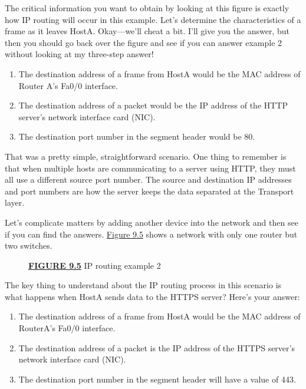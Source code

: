 The critical information you want to obtain by looking at this figure is
exactly how IP routing will occur in this example. Let's determine the
characteristics of a frame as it leaves HostA. Okay---we'll cheat a bit.
I'll give you the answer, but then you should go back over the figure
and see if you can answer example 2 without looking at my three-step
answer!

\begin{enumerate}
\tightlist
\item
  The destination address of a frame from HostA would be the MAC address
  of Router A's Fa0/0 interface.
\item
  The destination address of a packet would be the IP address of the
  HTTP server's network interface card (NIC).
\item
  The destination port number in the segment header would be 80.
\end{enumerate}

That was a pretty simple, straightforward scenario. One thing to
remember is that when multiple hosts are communicating to a server using
HTTP, they must all use a different source port number. The source and
destination IP addresses and port numbers are how the server keeps the
data separated at the Transport layer.

Let's complicate matters by adding another device into the network and
then see if you can find the answers.
\protect\hyperlink{c09.xhtmlux5cux23figure9-5}{Figure 9.5} shows a
network with only one router but two switches.

\begin{figure}
\centering
\caption{{\protect\hyperlink{c09.xhtmlux5cux23figureanchor9-5}{\textbf{FIGURE
9.5}} IP routing example 2}}
\end{figure}

\protect\hypertarget{c09.xhtmlux5cux23Page_369}{}{}The key thing to
understand about the IP routing process in this scenario is what happens
when HostA sends data to the HTTPS server? Here's your answer:

\begin{enumerate}
\tightlist
\item
  The destination address of a frame from HostA would be the MAC address
  of RouterA's Fa0/0 interface.
\item
  The destination address of a packet is the IP address of the HTTPS
  server's network interface card (NIC).
\item
  The destination port number in the segment header will have a value of
  443.
\end{enumerate}

